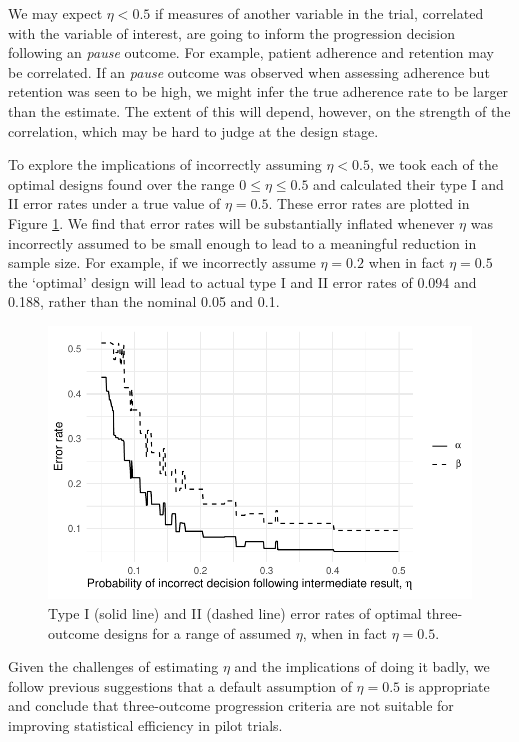 \documentclass{bmcart}
\begin{document}
We may expect $\eta < 0.5$ if measures of another variable in the trial, correlated with the variable of interest, are going to inform the progression decision following an \emph{pause} outcome. For example, patient adherence and retention may be correlated. If an \emph{pause} outcome was observed when assessing adherence but retention was seen to be high, we might infer the true adherence rate to be larger than the estimate. The extent of this will depend, however, on the strength of the correlation, which may be hard to judge at the design stage. 

To explore the implications of incorrectly assuming $\eta < 0.5$, we took each of the optimal designs found over the range $0 \leq \eta \leq 0.5$ and calculated their type I and II error rates under a true value of $\eta = 0.5$. These error rates are plotted in Figure \ref{fig:eta_true_ocs}. We find that error rates will be substantially inflated whenever $\eta$ was incorrectly assumed to be small enough to lead to a meaningful reduction in sample size. For example, if we incorrectly assume $\eta = 0.2$ when in fact $\eta = 0.5$ the `optimal' design will lead to actual type I and II error rates of 0.094 and 0.188, rather than the nominal 0.05 and 0.1.

\begin{figure}
\centering
\includegraphics[scale=0.8]{./figures/eta_true_ocs}
\caption{Type I (solid line) and II (dashed line) error rates of optimal three-outcome designs for a range of assumed $\eta$, when in fact $\eta = 0.5$.}
\label{fig:eta_true_ocs}
\end{figure}

Given the challenges of estimating $\eta$ and the implications of doing it badly, we follow previous suggestions \cite{Sargent2001a, Dehbi2020} that a default assumption of $\eta = 0.5$ is appropriate and conclude that three-outcome progression criteria are not suitable for improving statistical efficiency in pilot trials.
\end{document}
